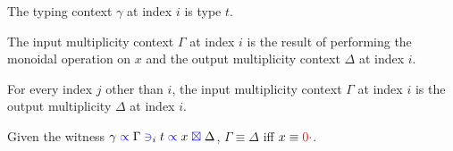 \documentclass[a4paper,UKenglish,cleveref, autoref, thm-restate,authorcolumns]{lipics-v2019}
\theoremstyle{definition}
\newcommand{\type}[1]{\textcolor{blue}{\operatorname{#1}}}
\newcommand{\field}[1]{\textcolor{red}{\operatorname{#1}}}
\newcommand{\zero}{\field{0\cdot}}
\newcommand{\contains}[6]{#1 \; \type{\propto} \; #2 \; \type{\ni}_{#3} \; #4 \; \type{\propto} \; #5 \; \type{\boxtimes} \; #6}
\begin{document}
\begin{lemma}
  The typing context $\gamma$ at index $i$ is type $t$.
\end{lemma}
\begin{lemma}
  The input multiplicity context $\Gamma$ at index $i$ is the result of performing the monoidal operation on $x$ and the output multiplicity context $\Delta$ at index $i$.
\end{lemma}
\begin{lemma}
  For every index $j$ other than $i$, the input multiplicity context $\Gamma$ at index $i$ is the output multiplicity $\Delta$ at index $i$.
\end{lemma}
\begin{corollary}
  Given the witness $\contains{\gamma}{\Gamma}{i}{t}{x}{\Delta}$, $\Gamma \equiv \Delta$ iff $x \equiv \zero$.
\end{corollary}
\end{document}
